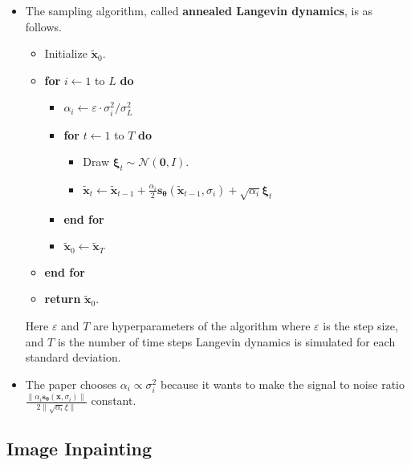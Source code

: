 \documentclass[10pt]{article}
\newcommand{\ve}[1]{\mathbf{#1}}
\newcommand{\ves}[1]{\boldsymbol{#1}}
\newcommand{\mcal}[1]{\mathcal{#1}}
\begin{document}
\begin{itemize}
  \item The sampling algorithm, called {\bf annealed Langevin dynamics}, is as follows.
  \begin{itemize}
    \item[] Initialize $\widetilde{\ve{x}}_0$.
    \item[] {\bf for} $i \gets 1$ to $L$ {\bf do}
    \begin{itemize}
      \item[] $\alpha_i \gets \varepsilon \cdot \sigma_i^2 / \sigma_L^2$      
      \item[] {\bf for} $t \gets 1$ to $T$ {\bf do}
      \begin{itemize}
        \item[] Draw $\ves{\xi}_t \sim \mcal{N}(\ve{0},I)$.
        \item[] $\widetilde{\ve{x}}_t \gets \widetilde{\ve{x}}_{t-1} + \frac{\alpha_i}{2}\ve{s}_{\ves{\theta}}(\widetilde{\ve{x}}_{t-1}, \sigma_i) + \sqrt{\alpha_i} \ve{\xi}_t $ 
      \end{itemize}
      \item[] {\bf end for}
      \item[] $\widetilde{\ve{x}}_0 \gets \widetilde{\ve{x}}_T$
    \end{itemize}
    \item[] {\bf end for}
    \item[] {\bf return} $\widetilde{\ve{x}}_0$.
  \end{itemize}
  Here $\varepsilon$ and $T$ are hyperparameters of the algorithm where $\varepsilon$ is the step size, and $T$ is the number of time steps Langevin dynamics is simulated for each standard deviation.

  \item The paper chooses $\alpha_i \propto \sigma_i^2$ because it wants to make the signal to noise ratio $\frac{\| \alpha_i \ve{s}_{\ves{\theta}}(\ve{x},\sigma_i) \| }{2 \| \sqrt{\alpha_i} \xi \|}$ constant.
\end{itemize}

\subsection{Image Inpainting}
\end{document}

